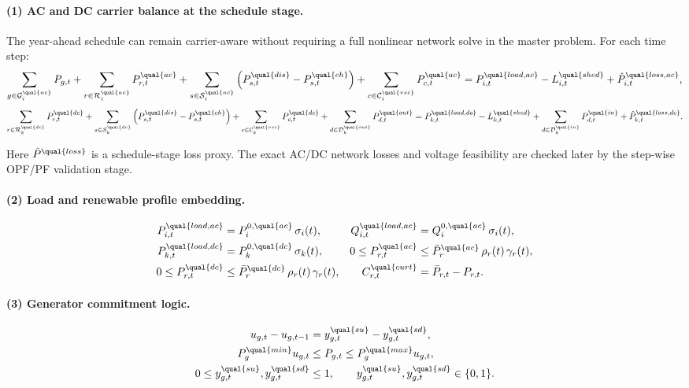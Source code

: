 \paragraph{(1) AC and DC carrier balance at the schedule stage.}
The year-ahead schedule can remain carrier-aware without requiring a full
nonlinear network solve in the master problem.  For each time step:
\begin{align}
\sum_{g\in\mathcal{G}_i^{\qual{ac}}} P_{g,t}
+ \sum_{r\in\mathcal{R}_i^{\qual{ac}}} P_{r,t}^{\qual{ac}}
+ \sum_{s\in\mathcal{S}_i^{\qual{ac}}} \left(P_{s,t}^{\qual{dis}}-P_{s,t}^{\qual{ch}}\right)
+ \sum_{c\in\mathcal{C}_i^{\qual{vsc}}} P_{c,t}^{\qual{ac}}
= P_{i,t}^{\qual{load,ac}} - L_{i,t}^{\qual{shed}} + \hat P_{i,t}^{\qual{loss,ac}},
\label{eq:annual-ac-balance}
\end{align}
\begin{align}
\sum_{r\in\mathcal{R}_k^{\qual{dc}}} P_{r,t}^{\qual{dc}}
+ \sum_{s\in\mathcal{S}_k^{\qual{dc}}} \left(P_{s,t}^{\qual{dis}}-P_{s,t}^{\qual{ch}}\right)
+ \sum_{c\in\mathcal{C}_k^{\qual{vsc}}} P_{c,t}^{\qual{dc}}
+ \sum_{d\in\mathcal{D}_{k}^{\qual{out}}} P_{d,t}^{\qual{out}}
= P_{k,t}^{\qual{load,dc}} - L_{k,t}^{\qual{shed}}
+ \sum_{d\in\mathcal{D}_{k}^{\qual{in}}} P_{d,t}^{\qual{in}} + \hat P_{k,t}^{\qual{loss,dc}}.
\label{eq:annual-dc-balance}
\end{align}

Here \(\hat P^{\qual{loss}}\) is a schedule-stage loss proxy.  The exact AC/DC
network losses and voltage feasibility are checked later by the step-wise OPF/PF
validation stage.

\paragraph{(2) Load and renewable profile embedding.}
\begin{align}
P_{i,t}^{\qual{load,ac}} &= P_{i}^{0,\qual{ac}}\,\sigma_i(t), &
Q_{i,t}^{\qual{load,ac}} &= Q_{i}^{0,\qual{ac}}\,\sigma_i(t), \\
P_{k,t}^{\qual{load,dc}} &= P_{k}^{0,\qual{dc}}\,\sigma_k(t), &
0 \le P_{r,t}^{\qual{ac}} &\le \bar P_{r}^{\qual{ac}}\,\rho_r(t)\,\gamma_r(t), \\
0 \le P_{r,t}^{\qual{dc}} &\le \bar P_{r}^{\qual{dc}}\,\rho_r(t)\,\gamma_r(t), &
C_{r,t}^{\qual{curt}} &= \bar P_{r,t} - P_{r,t}.
\label{eq:annual-profile-embed}
\end{align}

\paragraph{(3) Generator commitment logic.}
\begin{align}
u_{g,t} - u_{g,t-1} &= y_{g,t}^{\qual{su}} - y_{g,t}^{\qual{sd}}, \\
P_g^{\qual{min}} u_{g,t} &\le P_{g,t} \le P_g^{\qual{max}} u_{g,t}, \\
0 \le y_{g,t}^{\qual{su}}, y_{g,t}^{\qual{sd}} &\le 1,
\qquad y_{g,t}^{\qual{su}}, y_{g,t}^{\qual{sd}} \in \{0,1\}.
\label{eq:annual-commitment}
\end{align}

